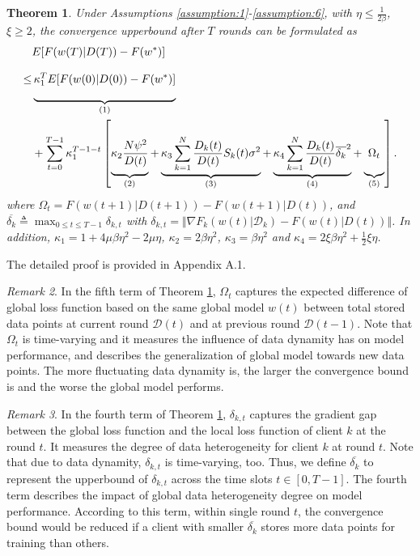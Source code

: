 \documentclass{article}
\theoremstyle{plain}
\newtheorem{theorem}{Theorem}[section]
\theoremstyle{definition}
\theoremstyle{remark}
\newtheorem{remark}[theorem]{Remark}
\begin{document}
\begin{theorem}
  \label{theorem:1}
  Under Assumptions \ref{assumption:1}-\ref{assumption:6}, with $\eta \leq \frac{1}{2\beta}$, $\xi \geq 2$, the convergence upperbound after $T$ rounds can be formulated as
  \begin{align}
      & E[F(w(T)|D(T)) - F(w^*)] \notag \\ 
 \leq & \underbrace{\vphantom{\sum_{min}^{max}\frac{1}{2}} \kappa_1^{T} E[F(w(0)|D(0))-F(w^*)]}_{(1)} \notag \\
      & + \sum_{t=0}^{T-1} \kappa_1^{T-1-t} \left[\underbrace{\vphantom{\sum_{min}^{max}\frac{1}{2}} \kappa_2 \frac{N\psi^2}{D(t)}}_{(2)} + \underbrace{\vphantom{\sum_{min}^{max}\frac{1}{2}} \kappa_3 \sum_{k=1}^{N} \frac{D_k(t)}{D(t)} S_k(t) \sigma^2}_{(3)} + \underbrace{\vphantom{\sum_{min}^{max}\frac{1}{2}} \kappa_4 \sum_{k=1}^{N} \frac{D_k(t)}{D(t)} \overline{\delta_k}^2}_{(4)} + \underbrace{\vphantom{\sum_{min}^{max}\frac{1}{2}} \Omega_{t}}_{(5)}\right]. \notag \\ 
  \end{align}
  where $\Omega_t = F(w(t+1)|D(t+1)) - F(w(t+1)|D(t))$,
  and $\overline{\delta_k} \triangleq \max_{0 \leq t \leq T-1} \delta_{k,t}$ with $\delta_{k,t} = \Vert \nabla F_k(w(t)|\mathcal{D}_k) - F(w(t)|D(t)) \Vert$.
  In addition, $\kappa_1 = 1 + 4\mu\beta\eta^2 - 2\mu\eta$, $\kappa_2 = 2\beta\eta^2$, $\kappa_3 = \beta\eta^2$ and $\kappa_4 = 2\xi\beta\eta^2 + \frac{1}{2}\xi\eta$. 
\end{theorem}

The detailed proof is provided in Appendix A.1.
\begin{remark}
  In the fifth term of Theorem \ref{theorem:1}, $\Omega_t$ captures the expected difference of global loss function based on the same global model $w(t)$ between total stored data points at current round $\mathcal{D}(t)$ and at previous round $\mathcal{D}(t-1)$.
  Note that $\Omega_t$ is time-varying and it measures the influence of data dynamity has on model performance, and describes the generalization of global model towards new data points. 
  The more fluctuating data dynamity is, the larger the convergence bound is and the worse the global model performs. 
\end{remark}
\begin{remark}
  In the fourth term of Theorem \ref{theorem:1}, $\delta_{k,t}$ captures the gradient gap between the global loss function and the local loss function of client $k$ at the round $t$. 
  It measures the degree of data heterogeneity for client $k$ at round $t$. Note that due to data dynamity, $\delta_{k,t}$ is time-varying, too.
  Thus, we define $\overline{\delta_k}$ to represent the upperbound of $\delta_{k,t}$ across the time slots $t \in [0, T-1]$. The fourth term describes the impact of global data heterogeneity degree on model performance.
  According to this term, within single round $t$, the convergence bound would be reduced if a client with smaller $\overline{\delta_k}$ stores more data points for training than others.
\end{remark}
\end{document}
